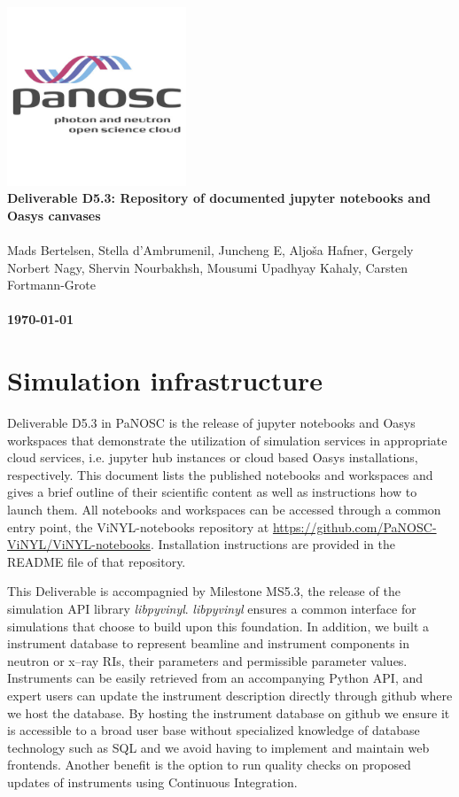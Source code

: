 \documentclass[10pt]{scrartcl}
\begin{document}
\makeatletter
\begin{titlepage}
\thispagestyle{scrheadings}
\ohead{}
\ihead{}
\chead{}
\ifoot{}
\ofoot{}
\noindent%
\includegraphics[width=0.4\textwidth]{figures/PaNOSClogo_web_RGB_512x512.jpg}\\
\Huge{%
\renewcommand{\baselinestretch}{2.0}%
  \textbf{%
    Deliverable D5.3: Repository of documented jupyter notebooks and Oasys canvases\\
  }%
}%
\\
{%
\Large{%
  Mads Bertelsen,
  Stella d'Ambrumenil,
  Juncheng E,
  Aljo\v{s}a Hafner,
  Gergely Norbert Nagy,
  Shervin Nourbakhsh,
  Mousumi Upadhyay Kahaly,
  Carsten Fortmann-Grote
  \bigskip\\
  \bigskip\\
  \textbf{\today}%
}}%
\end{titlepage}
\makeatother

\section{Simulation infrastructure}
Deliverable D5.3 in PaNOSC is the release of jupyter notebooks and Oasys
workspaces
that demonstrate the utilization of simulation services in appropriate cloud
services, i.e. jupyter hub instances or cloud based Oasys installations,
respectively. This document lists the published notebooks and workspaces and
gives a brief outline of their scientific content as well as instructions how to
launch them. All notebooks and workspaces can be accessed through a common entry
point, the ViNYL-notebooks repository at
\url{https://github.com/PaNOSC-ViNYL/ViNYL-notebooks}. Installation instructions
are provided in the README file of that repository.

This Deliverable is accompagnied by Milestone MS5.3, the release of the
simulation API library \textit{libpyvinyl}. \textit{libpyvinyl}
ensures a common interface for
simulations that choose to build upon this foundation. In addition, we built
a instrument database to represent beamline and instrument components in neutron
or x--ray RIs, their parameters and permissible parameter values.
Instruments can be easily retrieved from an
accompanying Python API, and expert users can update the instrument description
directly through github where we host the database. By hosting the instrument
database on github we ensure it is accessible to a broad user base without
specialized knowledge of database technology such as SQL and we avoid having to
implement and maintain web frontends. Another benefit is the
option to run quality checks on proposed updates of instruments using
Continuous Integration.
\end{document}

